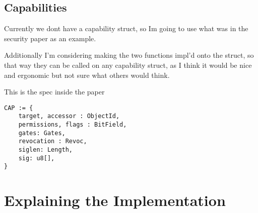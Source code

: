 \documentclass{article}
\begin{document}
\subsection{Capabilities}

Currently we dont have a capability struct, so Im going to use
what was in the security paper as an example.

Additionally I'm considering making the two functions impl'd onto the struct,
so that way they can be called on any capability struct, as I think it would
be nice and ergonomic but not sure what others would think.

This is the spec inside the paper

\begin{verbatim}
CAP := {
    target, accessor : ObjectId,
    permissions, flags : BitField,
    gates: Gates,
    revocation : Revoc,
    siglen: Length,
    sig: u8[],
}
\end{verbatim}


\section{Explaining the Implementation}
\end{document}
